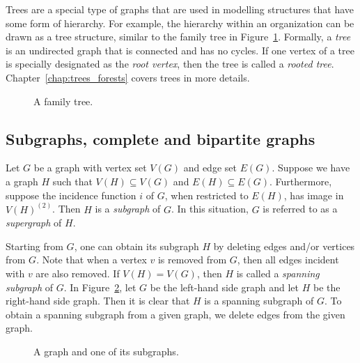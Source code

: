 Trees are a special type of graphs that are used in modelling
structures that have some form of
hierarchy. For example, the hierarchy
within an organization can be drawn as a tree structure, similar to
the family tree in
Figure~\ref{fig:introduction:family_tree}.
Formally, a \emph{tree} is an undirected graph that is
connected and has no cycles. If one vertex of a tree is specially
designated as the \emph{root vertex}, then the tree
is called a  \emph{rooted tree}.
Chapter~\ref{chap:trees_forests} covers trees in more details.

\begin{figure}[!htbp]
\centering
{}

\caption{A family tree.}
\label{fig:introduction:family_tree}
\end{figure}



\subsection{Subgraphs, complete and bipartite graphs}

Let $G$ be a graph with vertex set $V(G)$ and edge set $E(G)$. Suppose
we have a graph $H$ such that $V(H) \subseteq V(G)$ and
$E(H) \subseteq E(G)$. Furthermore, suppose the incidence function $i$
of $G$, when restricted to $E(H)$, has image in $V(H)^{(2)}$. Then $H$
is a \emph{subgraph} of $G$. In this situation, $G$ is
referred to as a \emph{supergraph} of $H$.

Starting from $G$, one can obtain its subgraph $H$ by deleting edges
and/or vertices from $G$. Note that when a vertex $v$ is removed from
$G$, then all edges incident with $v$ are also removed. If
$V(H) = V(G)$, then $H$ is called a
\emph{spanning subgraph} of $G$. In
Figure~\ref{fig:introduction:star_subgraph}, let $G$ be the left-hand
side graph and let $H$ be the right-hand side graph. Then it is clear
that $H$ is a spanning subgraph of $G$. To obtain a spanning subgraph
from a given graph, we delete edges from the given graph.

\begin{figure}[!htbp]
\centering

\caption{A graph and one of its subgraphs.}
\label{fig:introduction:star_subgraph}
\end{figure}


